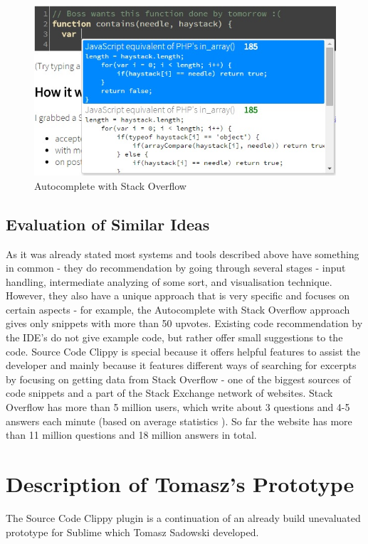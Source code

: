 \documentclass{l4proj}
\begin{document}
\begin{figure}[H]
\includegraphics[scale=0.8]{autocomplete}
\centering
\caption{Autocomplete with Stack Overflow}\label{autocomplete}
\label{fig:autocomplete}
\end{figure}

\newpage
\subsection{Evaluation of Similar Ideas}
As it was already stated most systems and tools described above have something in common - they do recommendation by going through several stages - input handling, intermediate analyzing of some sort, and visualisation technique. However, they also have a unique approach that is very specific and focuses on certain aspects - for example, the Autocomplete with Stack Overflow approach gives only snippets with more than 50 upvotes. Existing code recommendation by the IDE's do not give example code, but rather offer small suggestions to the code. Source Code Clippy is special because it offers helpful features to assist the developer and mainly because it features different ways of searching for excerpts by focusing on getting data from Stack Overflow - one of the biggest sources of code snippets and a part of the Stack Exchange network of websites. Stack Overflow has more than 5 million users, which write about 3 questions and 4-5 answers each minute (based on average statistics ). So far the website has more than 11 million questions and 18 million answers in total.

\section{Description of Tomasz's Prototype}
The Source Code Clippy plugin is a continuation of an already build unevaluated prototype for Sublime which Tomasz Sadowski developed.
\end{document}
